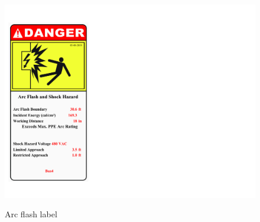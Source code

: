 \begin{figure}
	\includegraphics[scale=0.5]{figures/ARC1_3_5X7_Danger1_Bus.pdf} \\
	\caption{Arc flash label}
	\label{fig_ch04_elecaudit_arflashlable}
\end{figure}
